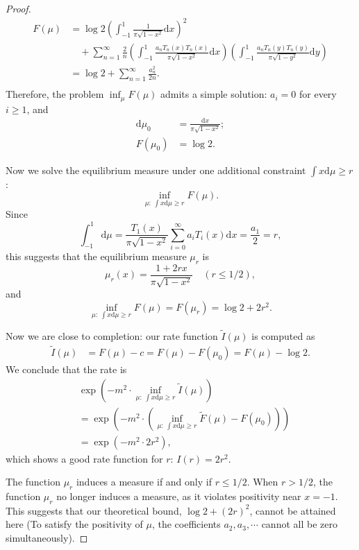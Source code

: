 \documentclass{article} %
\begin{document}
\begin{proof}
    \[
    \begin{aligned}
        F(\mu) &= \log 2 \left(\int_{-1}^{1} \frac{1}{\pi \sqrt{1-x^2}} \mathrm{d} x\right)^2 \\
        & \quad + \sum_{n=1}^{\infty}\frac 2 n \left(\int_{-1}^{1} \frac{a_n T_n(x)T_n(x)}{\pi \sqrt{1-x^2}} \mathrm{d}x \right) \left(\int_{-1}^{1} \frac{a_n T_n(y)T_n(y)}{\pi \sqrt{1-y^2}} \mathrm{d}y \right)  \\
        &= \log 2 + \sum_{n=1}^{\infty} \frac{a_n^2}{2n}. \\
    \end{aligned}
    \]
    Therefore, the problem $\inf_\mu F(\mu)$ admits a simple solution: $a_i = 0$ for every $i \ge 1$,
    and 
    \[ \begin{aligned}
        \mathrm{d} \mu_0 &= \frac{\mathrm{d} x}{\pi \sqrt{1-x^2}}; \\
        F(\mu_0) &= \log 2.
    \end{aligned} \]

    Now we solve the equilibrium measure under one additional constraint $\int x\mathrm{d} \mu \ge r$: 
    \[\inf_{\mu:\ \int x\mathrm{d} \mu \ge r} F(\mu). \]
    Since
    \[
    \int_{-1}^{1} \mathrm{d} \mu = \frac{T_1(x)}{\pi \sqrt{1-x^2}} \sum_{i=0}^{\infty} a_i T_i(x) \mathrm{d} x = \frac{a_1}{2} = r,
    \]
    this suggests that the equilibrium measure $\mu_r$ is
    \[
    \mu_r (x) = \frac{1 + 2rx}{\pi \sqrt{1-x^2}} \quad (r \le 1/2),
    \]
    and 
    \[\inf_{\mu:\ \int x\mathrm{d} \mu \ge r} F(\mu) = F(\mu_r) = \log 2 + 2r^2. \]

    Now we are close to completion: our rate function $\tilde{I}(\mu)$ is computed as
    \[
    \begin{aligned}
        \tilde{I}(\mu) &= F(\mu) - c = F(\mu) - F(\mu_0) = F(\mu) - \log 2.
    \end{aligned}
    \]
    We conclude that the rate is
    \[ 
    \begin{aligned}
        &\exp \left(- m^2 \cdot \inf _{\mu:\ \int x\mathrm{d} \mu \ge r} \tilde{I} (\mu) \right) \\
        &= \exp \left(- m^2 \cdot (\inf _{\mu:\ \int x\mathrm{d} \mu \ge r} \tilde{F} (\mu) - F(\mu_0)) \right) \\
        &= \exp\left( - m^2 \cdot 2r^2 \right),
    \end{aligned}
    \]
    which shows a good rate function for $r$: $I(r) = 2r^2$.

    The function $\mu_r$ induces a measure if and only if $r \le 1/2$. 
    When $r > 1/2$, the function $\mu_r$ no longer induces a measure, as it violates positivity near $x=-1$. 
    This suggests that our theoretical bound, $\log 2 + (2r)^2$, cannot be attained here 
    (To satisfy the positivity of $\mu$, the coefficients $a_2, a_3, \cdots$ cannot all be zero simultaneously).


\end{proof}
\end{document}
